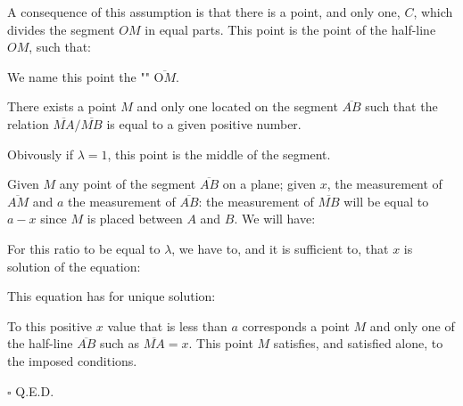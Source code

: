 	A consequence of this assumption is that there is a point, and only one, $C$, which divides the segment $OM$ in equal parts. This point is the point of the half-line $OM$, such that:
	
	We name this point the "" $\overline{\text{O}M}$.
	\begin{theorem}
	There exists a point $M$ and only one located on the segment $\overline{AB}$ such that the relation $\overline{MA}/\overline{MB}$ is equal to a given positive number.
	\end{theorem}
	\begin{tcolorbox}[title=Remark,colframe=black,arc=10pt]
	Obivously if $\lambda=1$, this point is the middle of the segment.
	\end{tcolorbox}
	\begin{dem}
	Given $M$ any point of the segment $\overline{AB}$ on a plane; given $x$, the measurement of $\overline{AM}$ and $a$  the measurement of $\overline{AB}$: the measurement of $\overline{MB}$ will be equal to $a-x$ since $M$ is placed between $A$ and $B$. We will have:
	
	For this ratio to be equal to $\lambda$, we have to, and it is sufficient to, that $x$ is solution of the equation:
	
	This equation has for unique solution:
	
	To this positive $x$ value that is less than $a$ corresponds a point $M$ and only one of the half-line $\overline{AB}$ such as $\overline{MA} = x$. This point $M$ satisfies, and satisfied alone, to the imposed conditions.
	\begin{flushright}
		$\square$  Q.E.D.
	\end{flushright}
	\end{dem}
	
